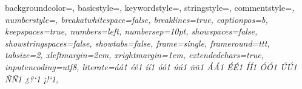  {
  backgroundcolor=\color{bgCodeColor},
  basicstyle=\ttfamily\small\color{black},
  keywordstyle=\color{kwColor},
  stringstyle=\color{stringColor},
  commentstyle=\color{codeGray}\itshape,
  numberstyle=\tiny\color{black},
  breakatwhitespace=false,
  breaklines=true,
  captionpos=b,
  keepspaces=true,
  numbers=left,
  numbersep=10pt,
  showspaces=false,
  showstringspaces=false,
  showtabs=false,
  frame=single,
  frameround=ttt,
  tabsize=2,
  xleftmargin=2em,
  xrightmargin=1em,
  extendedchars=true,
  inputencoding=utf8,
  literate={á}{{\'a}}1 {é}{{\'e}}1 {í}{{\'i}}1 {ó}{{\'o}}1 {ú}{{\'u}}1
           {ñ}{{\~n}}1 {Á}{{\'A}}1 {É}{{\'E}}1 {Í}{{\'I}}1 {Ó}{{\'O}}1
           {Ú}{{\'U}}1 {Ñ}{{\~N}}1 {¿}{{?`}}1 {¡}{{!`}}1,
}
\lstset{style=codeSnippet}
\renewcommand{\lstlistingname}{\USAL@listing}
\renewcommand{\lstlistlistingname}{\USAL@listoflistings}


\RequirePackage{pgfgantt}
\ifx\usal@language\usal@spanishname
  \def\pgfcalendarmonthshortname#1{\ifcase#1\or ene\or feb\or mar\or abr\or may\or jun\or jul\or ago\or sep\or oct\or nov\or dic\fi}
  \def\pgfcalendarmonthname#1{\ifcase#1\or enero\or febrero\or marzo\or abril\or mayo\or junio\or julio\or agosto\or septiembre\or octubre\or noviembre\or diciembre\fi}
\fi


\renewcommand{\arraystretch}{1.15}

\newcommand{\tb}[1]{\textbf{#1}}

\newcommand{\riesgoAlto}[1]{\cellcolor{red!25}#1}
\newcommand{\riesgoMedio}[1]{\cellcolor{orange!25}#1}
\newcommand{\riesgoBajo}[1]{\cellcolor{green!20}#1}


